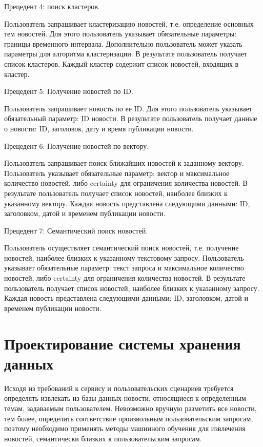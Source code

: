 Прецедент 4: поиск кластеров.

Пользователь запрашивает кластеризацию новостей, т.е. определение основных тем новостей. Для этого пользователь указывает обязательные параметры: границы временного интервала. Дополнительно пользователь может указать параметры для алгоритма кластеризации. В результате пользователь получает список кластеров. Каждый кластер содержит список новостей, входящих в кластер.

Прецедент 5: Получение новостей по ID.

Пользователь запрашивает новость по ее ID. Для этого пользователь указывает обязательный параметр: ID новости. В результате пользователь получает данные о новости: ID, заголовок, дату и время публикации новости.

Прецедент 6: Получение новостей по вектору.

Пользователь запрашивает поиск ближайших новостей к заданному вектору. Пользователь указывает обязательные параметр: вектор и максимальное количество новостей, либо certainty для ограничения количества новостей. В результате пользователь получает список новостей, наиболее близких к указанному вектору. Каждая новость представлена следующими данными: ID, заголовком, датой и временем публикации новости.

Прецедент 7: Семантический поиск новостей.

Пользователь осуществляет семантический поиск новостей, т.е. получение новостей, наиболее близких к указанному текстовому запросу. Пользователь указывает обязательные параметр: текст запроса и максимальное количество новостей, либо certainty для ограничения количества новостей. В результате пользователь получает список новостей, наиболее близких к указанному запросу. Каждая новость представлена следующими данными: ID, заголовком, датой и временем публикации новости.

\section{Проектирование системы хранения данных}
Исходя из требований к сервису и пользовательских сценариев требуется определять извлекать из базы данных новости, относящиеся к определенным темам, задаваемым пользователем. Невозможно вручную разметить все новости, тем более, определить соответствие произвольным пользовательским запросам, поэтому необходимо применять методы машинного обучения для извлечения новостей, семантически близких к пользовательским запросам.


